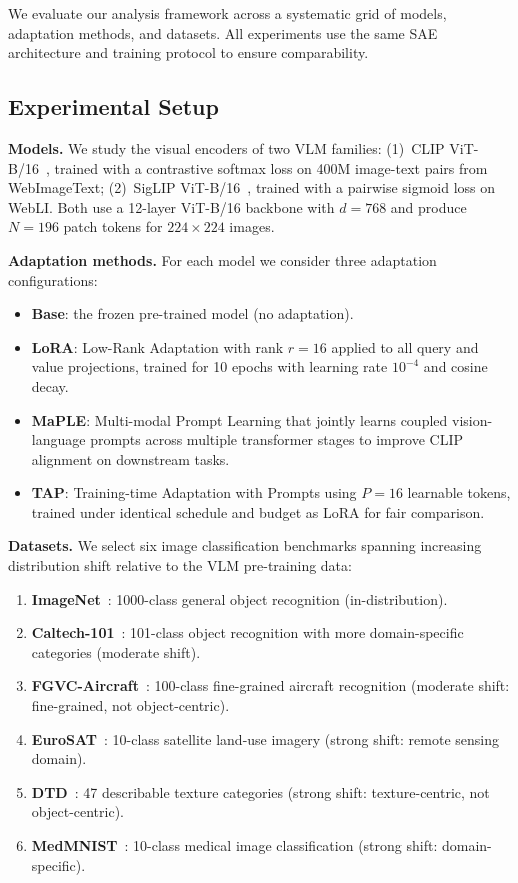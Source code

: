 We evaluate our analysis framework across a systematic grid of models, adaptation methods, and datasets.
All experiments use the same SAE architecture and training protocol to ensure comparability.

\subsection{Experimental Setup}
\label{sec:exp:setup}

\textbf{Models.}
We study the visual encoders of two VLM families:
(1)~CLIP ViT-B/16~\cite{radford2021learning}, trained with a contrastive softmax loss on 400M image-text pairs from WebImageText;
(2)~SigLIP ViT-B/16~\cite{zhai2023sigmoid}, trained with a pairwise sigmoid loss on WebLI.
Both use a 12-layer ViT-B/16 backbone with $d{=}768$ and produce $N{=}196$ patch tokens for $224{\times}224$ images.

\textbf{Adaptation methods.}
For each model we consider three adaptation configurations:
\begin{itemize}
    \item \textbf{Base}: the frozen pre-trained model (no adaptation).
    \item \textbf{LoRA}: Low-Rank Adaptation with rank $r{=}16$ applied to all query and value projections, trained for 10 epochs with learning rate $10^{-4}$ and cosine decay.
    \item \textbf{MaPLE}: Multi-modal Prompt Learning that jointly learns coupled vision-language prompts across multiple transformer stages to improve CLIP alignment on downstream tasks.
    \item \textbf{TAP}: Training-time Adaptation with Prompts using $P{=}16$ learnable tokens, trained under identical schedule and budget as LoRA for fair comparison.
\end{itemize}


\textbf{Datasets.}
We select six image classification benchmarks spanning increasing distribution shift relative to the VLM pre-training data:
\begin{enumerate}
    \item \textbf{ImageNet}~\cite{deng2009imagenet}: 1000-class general object recognition (in-distribution).
    \item \textbf{Caltech-101}~\cite{fei2004caltech}: 101-class object recognition with more domain-specific categories (moderate shift).
    \item \textbf{FGVC-Aircraft}~\cite{maji2013fine}: 100-class fine-grained aircraft recognition (moderate shift: fine-grained, not object-centric).
    \item \textbf{EuroSAT}~\cite{helber2019eurosat}: 10-class satellite land-use imagery (strong shift: remote sensing domain).
    \item \textbf{DTD}~\cite{cimpoi2013describing}: 47 describable texture categories (strong shift: texture-centric, not object-centric).
    \item \textbf{MedMNIST}~\cite{silva2021medmnist}: 10-class medical image classification (strong shift: domain-specific).
\end{enumerate}


